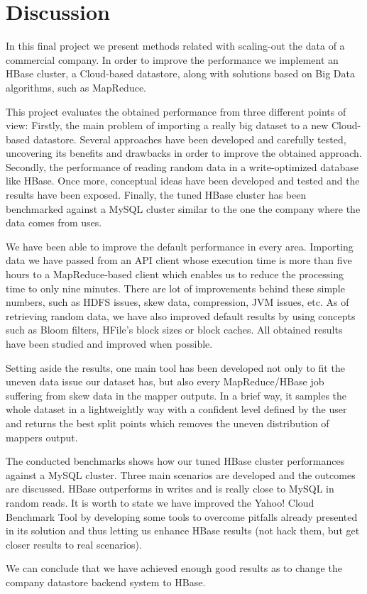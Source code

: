 \section{Discussion}

In this final project we present methods related with scaling-out the data of a commercial company. In order to improve the performance we implement an HBase cluster, a Cloud-based datastore, along with solutions based on Big Data algorithms, such as MapReduce.
\par
This project evaluates the obtained performance from three different points of view: Firstly, the main problem of importing a really big dataset to a new Cloud-based datastore. Several approaches have been developed and carefully tested, uncovering its benefits and drawbacks in order to improve the obtained approach. Secondly,  the performance of reading random data in a write-optimized database like HBase. Once more, conceptual ideas have been developed and tested and the results have been exposed. Finally, the tuned HBase cluster has been benchmarked against a MySQL cluster similar to the one the company where the data comes from uses.
\par
We have been able to improve the default performance in every area. Importing data we have passed from an API client whose execution time is more than five hours to a MapReduce-based client which enables us to reduce the processing time to only nine minutes. There are lot of improvements behind these simple numbers, such as HDFS issues, skew data, compression, JVM issues, etc. As of retrieving random data, we have also improved default results by using concepts such as Bloom filters, HFile's block sizes or block caches. All obtained results have been studied and improved when possible.
\par
Setting aside the results, one main tool has been developed not only to fit the uneven data issue our dataset has, but also every MapReduce/HBase job suffering from skew data in the mapper outputs. In a brief way, it samples the whole dataset in a lightweightly way with a confident level defined by the user and returns the best split points which removes the uneven distribution of mappers output.  
\par
The conducted benchmarks shows how our tuned HBase cluster performances against a MySQL cluster. Three main scenarios are developed and the outcomes are discussed. HBase outperforms in writes and is really close to MySQL in random reads. It is worth to state we have improved the Yahoo! Cloud Benchmark Tool by developing some tools to overcome pitfalls already presented in its solution and thus letting us enhance HBase results (not hack them, but get closer results to real scenarios).
\par
We can conclude that we have achieved enough good results as to change the company datastore backend system to HBase.

